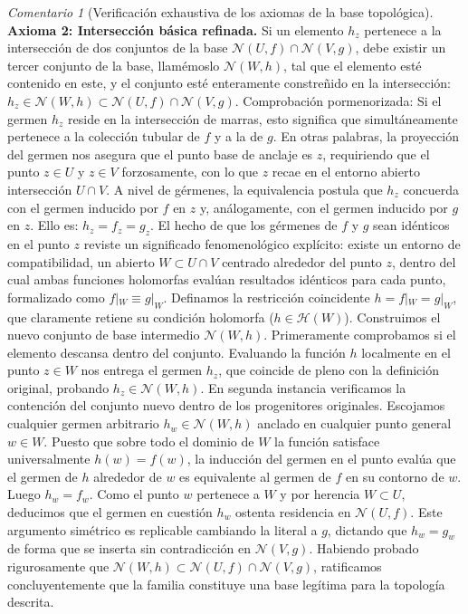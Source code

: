 \documentclass[11pt,a4paper]{article}
\theoremstyle{definition}
\theoremstyle{remark}
\newtheorem{observacion}{Comentario}[section]
\numberwithin{equation}{section}
\begin{document}
\begin{observacion}[Verificación exhaustiva de los axiomas de la base topológica]
\textbf{Axioma 2: Intersección básica refinada.} Si un elemento $h_z$ pertenece a la intersección de dos conjuntos de la base $\mathcal{N}(U, f) \cap \mathcal{N}(V, g)$, debe existir un tercer conjunto de la base, llamémoslo $\mathcal{N}(W, h)$, tal que el elemento esté contenido en este, y el conjunto esté enteramente constreñido en la intersección: $h_z \in \mathcal{N}(W, h) \subset \mathcal{N}(U, f) \cap \mathcal{N}(V, g)$.
Comprobación pormenorizada: Si el germen $h_z$ reside en la intersección de marras, esto significa que simultáneamente pertenece a la colección tubular de $f$ y a la de $g$. En otras palabras, la proyección del germen nos asegura que el punto base de anclaje es $z$, requiriendo que el punto $z \in U$ y $z \in V$ forzosamente, con lo que $z$ recae en el entorno abierto intersección $U \cap V$.
A nivel de gérmenes, la equivalencia postula que $h_z$ concuerda con el germen inducido por $f$ en $z$ y, análogamente, con el germen inducido por $g$ en $z$. Ello es: $h_z = f_z = g_z$.
El hecho de que los gérmenes de $f$ y $g$ sean idénticos en el punto $z$ reviste un significado fenomenológico explícito: existe un entorno de compatibilidad, un abierto $W \subset U \cap V$ centrado alrededor del punto $z$, dentro del cual ambas funciones holomorfas evalúan resultados idénticos para cada punto, formalizado como $f|_W \equiv g|_W$.
Definamos la restricción coincidente $h = f|_W = g|_W$, que claramente retiene su condición holomorfa ($h \in \mathcal{H}(W)$). Construimos el nuevo conjunto de base intermedio $\mathcal{N}(W, h)$.
Primeramente comprobamos si el elemento descansa dentro del conjunto. Evaluando la función $h$ localmente en el punto $z \in W$ nos entrega el germen $h_z$, que coincide de pleno con la definición original, probando $h_z \in \mathcal{N}(W, h)$.
En segunda instancia verificamos la contención del conjunto nuevo dentro de los progenitores originales. Escojamos cualquier germen arbitrario $h_w \in \mathcal{N}(W, h)$ anclado en cualquier punto general $w \in W$. Puesto que sobre todo el dominio de $W$ la función satisface universalmente $h(w) = f(w)$, la inducción del germen en el punto evalúa que el germen de $h$ alrededor de $w$ es equivalente al germen de $f$ en su contorno de $w$. Luego $h_w = f_w$. Como el punto $w$ pertenece a $W$ y por herencia $W \subset U$, deducimos que el germen en cuestión $h_w$ ostenta residencia en $\mathcal{N}(U, f)$. Este argumento simétrico es replicable cambiando la literal a $g$, dictando que $h_w = g_w$ de forma que se inserta sin contradicción en $\mathcal{N}(V, g)$. Habiendo probado rigurosamente que $\mathcal{N}(W, h) \subset \mathcal{N}(U, f) \cap \mathcal{N}(V, g)$, ratificamos concluyentemente que la familia constituye una base legítima para la topología descrita.
\end{observacion}
\end{document}
